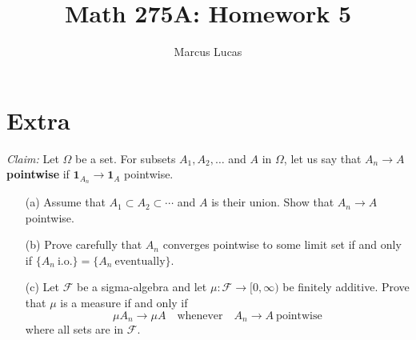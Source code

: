 \documentclass[10pt]{article}
\title{Math 275A: Homework 5}
\author{Marcus Lucas}
\date{\vspace{-1cm}}
\begin{document}
\maketitle

\section*{Extra}
\textit{Claim:} Let $\Omega$ be a set. 
For subsets $A_1, A_2, \dots$ and $A$ in $\Omega$,
let us say that $A_n \to A$ \textbf{pointwise} if
$\mathbf{1}_{A_n} \to \mathbf{1}_{A}$ pointwise.
\begin{itemize}
  \item[(a)] Assume that $A_1 \subset A_2 \subset \cdots$
  and $A$ is their union. Show that $A_n \to A$ pointwise.

  \item[(b)] Prove carefully that $A_n$ converges pointwise
  to some limit set if and only if 
  $\{A_n \ \text{i.o.}\} = \{A_n \ \text{eventually}\}$.

  \item[(c)] Let $\mathcal{F}$ be a sigma-algebra and let
  $\mu : \mathcal{F} \to [0,\infty)$ be finitely additive.
  Prove that $\mu$ is a measure if and only if
  \begin{equation*}
    \mu A_n \to \mu A \quad \text{whenever} \quad
    A_n \to A \ \text{pointwise}
  \end{equation*}
  where all sets are in $\mathcal{F}$.
\end{itemize}
\end{document}
